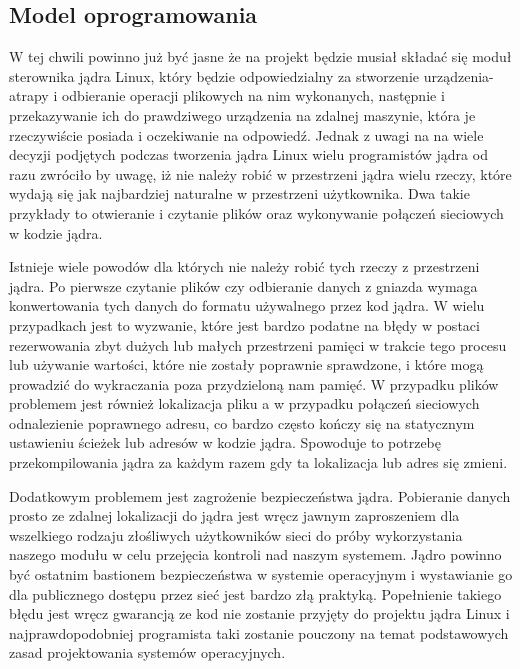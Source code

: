 \documentclass[10pt]{article}
\begin{document}
\subsection{Model oprogramowania}
\label{softmodel}

W tej chwili powinno już być jasne że na projekt będzie musiał składać się moduł sterownika jądra Linux, który będzie odpowiedzialny za stworzenie urządzenia-atrapy i odbieranie operacji plikowych na nim wykonanych, następnie i przekazywanie ich do prawdziwego urządzenia na zdalnej maszynie, która je rzeczywiście posiada i oczekiwanie na odpowiedź. Jednak z uwagi na na wiele decyzji podjętych podczas tworzenia jądra Linux wielu programistów jądra od razu zwróciło by uwagę, iż nie należy robić w przestrzeni jądra wielu rzeczy, które wydają się jak najbardziej naturalne w przestrzeni użytkownika. Dwa takie przykłady to otwieranie i czytanie plików oraz wykonywanie połączeń sieciowych w kodzie jądra.

Istnieje wiele powodów dla których nie należy robić tych rzeczy z przestrzeni jądra. Po pierwsze czytanie plików czy odbieranie danych z gniazda wymaga konwertowania tych danych do formatu używalnego przez kod jądra. W wielu przypadkach jest to wyzwanie, które jest bardzo podatne na błędy w postaci rezerwowania zbyt dużych lub małych przestrzeni pamięci w trakcie tego procesu lub używanie wartości, które nie zostały poprawnie sprawdzone, i które mogą prowadzić do wykraczania poza przydzieloną nam pamięć. W przypadku plików problemem jest również lokalizacja pliku a w przypadku połączeń sieciowych odnalezienie poprawnego adresu, co bardzo często kończy się na statycznym ustawieniu ścieżek lub adresów w kodzie jądra. Spowoduje to potrzebę przekompilowania jądra za każdym razem gdy ta lokalizacja lub adres się zmieni.

Dodatkowym problemem jest zagrożenie bezpieczeństwa jądra. Pobieranie danych prosto ze zdalnej lokalizacji do jądra jest wręcz jawnym zaproszeniem dla wszelkiego rodzaju złośliwych użytkowników sieci do próby wykorzystania naszego modułu w celu przejęcia kontroli nad naszym systemem. Jądro powinno być ostatnim bastionem bezpieczeństwa w systemie operacyjnym i wystawianie go dla publicznego dostępu przez sieć jest bardzo złą praktyką. Popełnienie takiego błędu jest wręcz gwarancją ze kod nie zostanie przyjęty do projektu jądra Linux i najprawdopodobniej programista taki zostanie pouczony na temat podstawowych zasad projektowania systemów operacyjnych.
\end{document}
